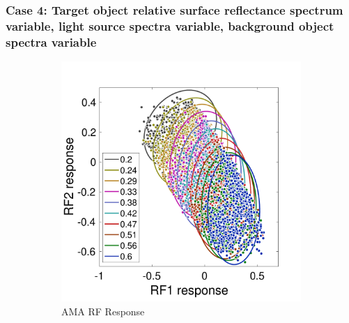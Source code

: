 \documentclass{jov}
\begin{document}

\subsubsection{Case 4: Target object relative surface reflectance spectrum variable, light source spectra variable, background object spectra variable}
\begin{figure}
\centering
    \begin{subfigure}[b]{0.3 \textwidth}   
        \includegraphics[width=\textwidth]{../Figures/Figure12/Figure12_a.pdf}
        \caption{AMA RF Response}
        \label{fig:case12FiltersResponse}
    \end{subfigure}    
        \begin{subfigure}[b]{0.3 \textwidth}

\end{subfigure}
\end{figure}
\end{document}
